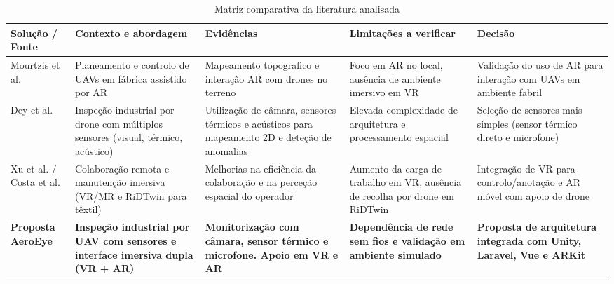 \documentclass[conference,a4paper]{IEEEtran}
\begin{document}
\begin{table}[!t]
\caption{Matriz comparativa da literatura analisada}
\label{tab:comparison}
\centering
\footnotesize
\setlength{\tabcolsep}{4pt}
\renewcommand{\arraystretch}{1.18}
\begin{tabular}{|>{\raggedright\arraybackslash}p{}|>{\raggedright\arraybackslash}p{}|>{\raggedright\arraybackslash}p{}|>{\raggedright\arraybackslash}p{}|>{\raggedright\arraybackslash}p{}|}
\hline
\textbf{Solução / Fonte} & \textbf{Contexto e abordagem} & \textbf{Evidências} & \textbf{Limitações a verificar} & \textbf{Decisão} \\ \hline
Mourtzis et al. \cite{Mourtzis02052024} & Planeamento e controlo de UAVs em fábrica assistido por AR & Mapeamento topografico e interação AR com drones no terreno & Foco em AR no local, ausência de ambiente imersivo em VR & Validação do uso de AR para interação com UAVs em ambiente fabril \\ \hline
Dey et al. \cite{Dey2026} & Inspeção industrial por drone com múltiplos sensores (visual, térmico, acústico) & Utilização de câmara, sensores térmicos e acústicos para mapeamento 2D e deteção de anomalias & Elevada complexidade de arquitetura e processamento espacial & Seleção de sensores mais simples (sensor térmico direto e microfone) \\ \hline
Xu et al. \cite{11355682} / Costa et al. \cite{repec:gam:jftint:v:18:y:2026:i:6:p:330-:d:1969785} & Colaboração remota e manutenção imersiva (VR/MR e RiDTwin para têxtil) & Melhorias na eficiência da colaboração e na perceção espacial do operador & Aumento da carga de trabalho em VR, ausência de recolha por drone em RiDTwin & Integração de VR para controlo/anotação e AR móvel com apoio de drone \\ \hline
\textbf{Proposta AeroEye} & \textbf{Inspeção industrial por UAV com sensores e interface imersiva dupla (VR + AR)} & \textbf{Monitorização com câmara, sensor térmico e microfone. Apoio em VR e AR} & \textbf{Dependência de rede sem fios e validação em ambiente simulado} & \textbf{Proposta de arquitetura integrada com Unity, Laravel, Vue e ARKit} \\ \hline
\end{tabular}
\end{table}
\end{document}
